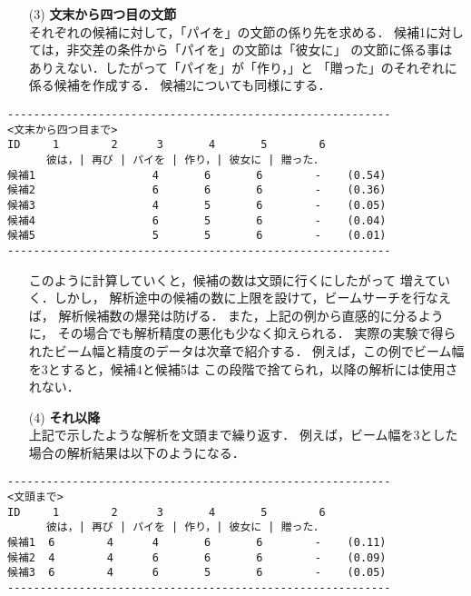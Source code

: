 \begin{enumerate}
\item[(3)]  {\bf 文末から四つ目の文節} \\
  それぞれの候補に対して，「パイを」の文節の係り先を求める．
  候補1に対しては，非交差の条件から「パイを」の文節は「彼女に」
  の文節に係る事はありえない．したがって「パイを」が「作り，」と
  「贈った」のそれぞれに係る候補を作成する．
  候補2についても同様にする．
\end{enumerate}
\begin{verbatim}
-----------------------------------------------------------
<文末から四つ目まで>
ID     1        2      3       4       5        6
      彼は，| 再び | パイを | 作り，| 彼女に | 贈った．
候補1                  4       6       6        -    (0.54)
候補2                  6       6       6        -    (0.36)
候補3                  4       5       6        -    (0.05)
候補4                  6       5       6        -    (0.04)
候補5                  5       5       6        -    (0.01)
-----------------------------------------------------------
\end{verbatim}
\begin{enumerate}
\item[]
  このように計算していくと，候補の数は文頭に行くにしたがって
  増えていく．しかし，
  解析途中の候補の数に上限を設けて，ビームサーチを行なえば，
  解析候補数の爆発は防げる．
  また，上記の例から直感的に分るように，
  その場合でも解析精度の悪化も少なく抑えられる．
  実際の実験で得られたビーム幅と精度のデータは次章で紹介する．
  例えば，この例でビーム幅を3とすると，候補4と候補5は
  この段階で捨てられ，以降の解析には使用されない．
\item[(4)] {\bf それ以降} \\
      上記で示したような解析を文頭まで繰り返す．
      例えば，ビーム幅を3とした場合の解析結果は以下のようになる．
\end{enumerate}
\begin{verbatim}
-----------------------------------------------------------
<文頭まで>
ID     1        2      3       4       5        6
      彼は，| 再び | パイを | 作り，| 彼女に | 贈った．
候補1  6        4      4       6       6        -    (0.11)
候補2  4        4      6       6       6        -    (0.09)
候補3  6        4      6       5       6        -    (0.05)
-----------------------------------------------------------
\end{verbatim}

